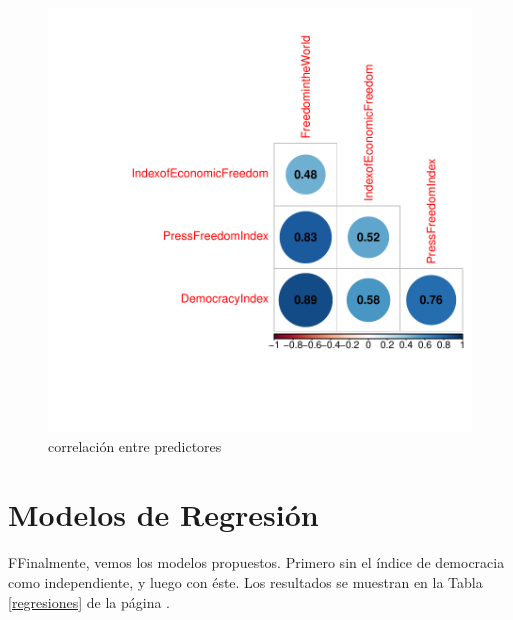 \documentclass{article}
\begin{document}
\begin{figure}[h]
\centering
\begin{adjustbox}{width=7cm,height=7cm,clip,trim=1.5cm 0.5cm 0cm 1.5cm}
\includegraphics{paperVersion_6-corrPlotX}
\end{adjustbox}
\caption{correlación entre predictores}
\label{corrPlotX}
\end{figure}


\clearpage

\section{Modelos de Regresión}

FFinalmente, vemos los modelos propuestos. Primero sin el índice de democracia como independiente, y luego con éste. Los resultados se muestran en la Tabla \ref{regresiones} de la página \pageref{regresiones}.
\end{document}
